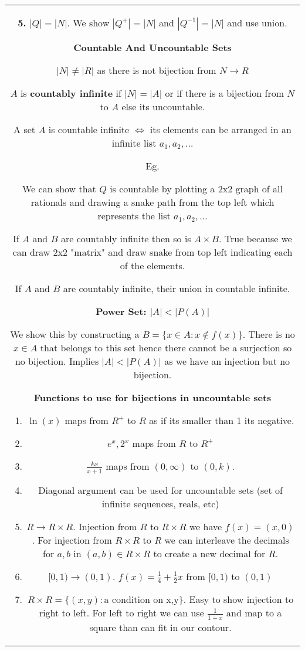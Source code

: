 \documentclass[a4paper]{article}
\begin{document}
\begin{tabular}{@{}c@{}}
\begin{minipage}[t][\paperheight][t]{0.49\paperwidth}
        \textbf{5.} $|Q| = |N|$. We show  $|Q^{+}| = |N|$ and $|Q^{-1}| = |N|$ and use union.




        \textbf{Countable And Uncountable Sets}
        
        $|N|\ne |R|$ as there is not bijection from $N \rightarrow R$
        
        $A$ is \textbf{countably infinite} if $|N| = |A|$ or if there is a bijection from $N$ to $A$ else its uncountable.

        A set $A$ is countable infinite $\iff$ its elements can be arranged in an infinite list $a_1,a_2,\dots$ 

        Eg.

        \qquad We can show that $Q$ is countable by plotting a 2x2  graph of all rationals and drawing a snake path from the top left which represents the list $a_1,a_2,\dots$

        If $A$ and $B$ are countably infinite then so is $A \times  B$.
        \qquad True because we can draw 2x2 "matrix" and draw snake from top left indicating each of the elements.

        If $A$ and $B$ are countably infinite, their union in countable infinite.

        \textbf{Power Set: $|A| < |P(A)|$}

        We show this by constructing a $B = \{x \in A: x \not \in f(x)\}$. There is no  $x \in A$ that belongs to this set hence there cannot be a surjection so no bijection. Implies $|A| < |P(A)|$ as we have an injection but no bijection.



        \textbf{Functions to use for bijections in uncountable sets}
        \begin{enumerate}
            \item $\ln(x)$ maps from $R^{+}$ to $R$ as if its smaller than 1 its negative. 
            \item $e^{x},2^{x}$ maps from $R$ to $R^{+}$
            \item $\frac{kx}{x+1}$ maps from $(0,\infty)$ to $(0,k)$. 
            \item Diagonal argument can be used for uncountable sets (set of infinite sequences, reals, etc)
            \item $R \rightarrow R \times R$. Injection from $R$ to $R \times  R$ we have $f(x) = (x, 0)$. For injection from  $R \times  R$ to $R$ we can interleave the decimals for $a,b$ in  $(a,b) \in R \times  R$ to create a new decimal for $R$.
            \item $[0,1) \rightarrow (0,1)$.  $f(x) = \frac{1}{4} + \frac{1}{2}x$ from  $[0,1)$ to  $(0,1)$
            \item $R \times  R = \{(x,y): \text{a condition on x,y}\}$. Easy to show injection to right to left. For left to right we can use $\frac{1}{1 + x}$ and map to a square than can fit in our contour.
        \end{enumerate}



\end{minipage}
\end{tabular}
\end{document}
